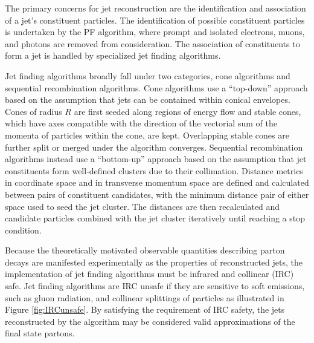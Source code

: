 The primary concerns for jet reconstruction are the identification and association of a jet's constituent particles. The identification of possible constituent particles is undertaken by the PF algorithm, where prompt and isolated electrons, muons, and photons are removed from consideration. The association of constituents to form a jet is handled by specialized jet finding algorithms.

Jet finding algorithms broadly fall under two categories, cone algorithms and sequential recombination algorithms. Cone algorithms use a ``top-down'' approach based on the assumption that jets can be contained within conical envelopes. Cones of radius $R$ are first seeded along regions of energy flow and stable cones, which have axes compatible with the direction of the vectorial sum of the momenta of particles within the cone, are kept. Overlapping stable cones are further split or merged under the algorithm converges. Sequential recombination algorithms instead use a ``bottom-up'' approach based on the assumption that jet constituents form well-defined clusters due to their collimation. Distance metrics in coordinate space and in transverse momentum space are defined and calculated between pairs of constituent candidates, with the minimum distance pair of either space used to seed the jet cluster. The distances are then recalculated and candidate particles combined with the jet cluster iteratively until reaching a stop condition.

Because the theoretically motivated observable quantities describing parton decays are manifested experimentally as the properties of reconstructed jets, the implementation of jet finding algorithms must be infrared and collinear (IRC) safe. Jet finding algorithms are IRC unsafe if they are sensitive to soft emissions, such as gluon radiation, and collinear splittings of particles as illustrated in Figure \ref{fig:IRCunsafe}. By satisfying the requirement of IRC safety, the jets reconstructed by the algorithm may be considered valid approximations of the final state partons.

